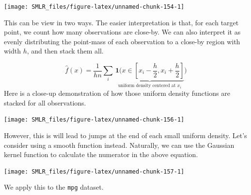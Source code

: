 \documentclass[
]{book}
\newenvironment{Shaded}{\begin{snugshade}}{\end{snugshade}}
\newcommand{\AttributeTok}[1]{\textcolor[rgb]{0.13,0.29,0.53}{#1}}
\newcommand{\ControlFlowTok}[1]{\textcolor[rgb]{0.13,0.29,0.53}{\textbf{#1}}}
\newcommand{\DecValTok}[1]{\textcolor[rgb]{0.00,0.00,0.81}{#1}}
\newcommand{\FloatTok}[1]{\textcolor[rgb]{0.00,0.00,0.81}{#1}}
\newcommand{\FunctionTok}[1]{\textcolor[rgb]{0.13,0.29,0.53}{\textbf{#1}}}
\newcommand{\NormalTok}[1]{#1}
\newcommand{\OtherTok}[1]{\textcolor[rgb]{0.56,0.35,0.01}{#1}}
\newcommand{\SpecialCharTok}[1]{\textcolor[rgb]{0.81,0.36,0.00}{\textbf{#1}}}
\newcommand{\StringTok}[1]{\textcolor[rgb]{0.31,0.60,0.02}{#1}}
\theoremstyle{definition}
\theoremstyle{definition}
\theoremstyle{definition}
\theoremstyle{definition}
\theoremstyle{remark}
\begin{document}
\begin{center}\texttt{[image: SMLR\_files/figure-latex/unnamed-chunk-154-1]} \end{center}

This can be view in two ways. The easier interpretation is that, for each target point, we count how many observations are close-by. We can also interpret it as evenly distributing the point-mass of each observation to a close-by region with width \(h\), and then stack them all.

\[\widehat f(x) = \frac{1}{h n} \sum_i \,\underbrace{ \mathbf{1} \Big(x \in [x_i - \frac{h}{2}, x_i + \frac{h}{2}]}_{\text{uniform density centered at } x_i} \Big)\]
Here is a close-up demonstration of how those uniform density functions are stacked for all observations.

\begin{center}\texttt{[image: SMLR\_files/figure-latex/unnamed-chunk-156-1]} \end{center}

However, this is will lead to jumps at the end of each small uniform density. Let's consider using a smooth function instead. Naturally, we can use the Gaussian kernel function to calculate the numerator in the above equation.

\begin{center}\texttt{[image: SMLR\_files/figure-latex/unnamed-chunk-157-1]} \end{center}

We apply this to the \texttt{mpg} dataset.

\begin{Shaded}
\end{Shaded}
\end{document}
